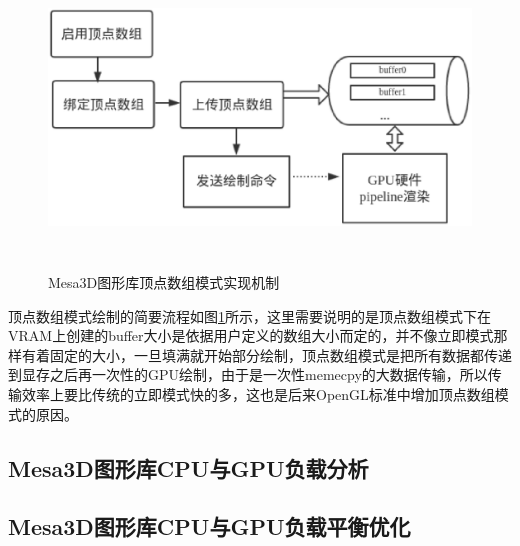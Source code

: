 \begin{figure}[H] 
  \centering
  \includegraphics[width=12cm,height=8cm]{figures/chap03/vbo-flow}
  \caption{Mesa3D图形库顶点数组模式实现机制}
  \label{fig:vbo-flow}
\end{figure}

顶点数组模式绘制的简要流程如图\ref{fig:vbo-flow}所示，这里需要说明的是顶点数组模式下在VRAM上创建的buffer大小是依据用户定义的数组大小而定的，并不像立即模式那样有着固定的大小，一旦填满就开始部分绘制，顶点数组模式是把所有数据都传递到显存之后再一次性的GPU绘制，由于是一次性memecpy的大数据传输，所以传输效率上要比传统的立即模式快的多，这也是后来OpenGL标准中增加顶点数组模式的原因。

\subsection{Mesa3D图形库CPU与GPU负载分析}

\subsection{Mesa3D图形库CPU与GPU负载平衡优化}
